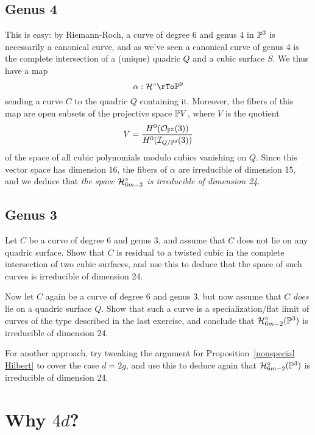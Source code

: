 \subsection{Genus 4}

This is easy: by Riemann-Roch, a curve of degree 6 and genus 4 in $\PP^3$ is necessarily a canonical curve, and as we've seen a canonical curve of genus 4 is the complete intersection of a (unique) quadric $Q$ and a cubic surface $S$. We thus have a map
$$
\alpha : \cH^\circ \rTo \PP^9
$$
sending a curve $C$ to the quadric $Q$ containing it. Moreover, the fibers of this map are open subsets of the projective space $\PP V$, where $V$ is the quotient
$$
V = \frac{H^0(\cO_{\PP^3}(3))}{H^0(\cI_{Q/\PP^3}(3))}
$$
of the space of all cubic polynomials modulo cubics vanishing on $Q$. Since this vector space has dimension 16, the fibers of $\alpha$ are irreducible of dimension 15, and we deduce that \emph{the space $\cH^\circ_{6m-3}$ is irreducible of dimension 24}.

\subsection{Genus 3}

\begin{exercise}
Let $C$ be a curve of degree 6 and genus 3, and assume that $C$ does not lie on any quadric surface. Show that $C$ is residual to a twisted cubic in the complete intersection of two cubic surfaces, and use this to deduce that the space of such curves is irreducible of dimension 24.
\end{exercise}


\begin{exercise}
Now let $C$ again be a curve of degree 6 and genus 3, but now assume that $C$ \emph{does} lie on a quadric surface $Q$. Show that such a curve is a specialization/flat limit of curves of the type described in the last exercise, and conclude that $\cH^\circ_{6m-2}(\PP^3)$ is irreducible of dimension 24.
\end{exercise}


\begin{exercise}
For another approach, try tweaking the argument for Proposition~\ref{nonspecial Hilbert} to cover the case $d=2g$, and use this to deduce again that $\cH^\circ_{6m-2}(\PP^3)$ is irreducible of dimension 24.
\end{exercise}

\section{Why  $4d$?}\label{estimating dim hilb}

